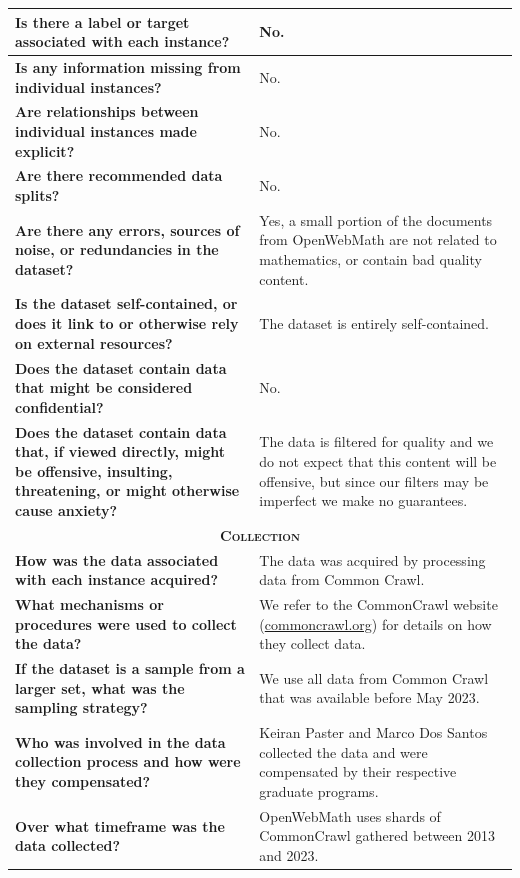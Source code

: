 \begin{longtable}{p{6cm}|p{6cm}}
    \textbf{Is there a label or target associated with each instance?} & No. \\ \midrule
    \textbf{Is any information missing from individual instances?} & No. \\ \midrule
    \textbf{Are relationships between individual instances made explicit?} & No. \\ \midrule
    \textbf{Are there recommended data splits?} & No. \\ \midrule
    \textbf{Are there any errors, sources of noise, or redundancies in the dataset?} & Yes, a small portion of the documents from OpenWebMath are not related to mathematics, or contain bad quality content. \\ \midrule
    \textbf{Is the dataset self-contained, or does it link to or otherwise rely on external resources?} & The dataset is entirely self-contained. \\ \midrule
    \textbf{Does the dataset contain data that might be considered confidential?} & No. \\ \midrule
    \textbf{Does the dataset contain data that, if viewed directly, might be offensive, insulting, threatening, or might otherwise cause anxiety?} & The data is filtered for quality and we do not expect that this content will be offensive, but since our filters may be imperfect we make no guarantees. \\ \midrule
    \multicolumn{2}{c}{\textsc{\textbf{Collection}}} \\ \midrule
    \textbf{How was the data associated with each instance acquired?} & The data was acquired by processing data from Common Crawl. \\ \midrule
    \textbf{What mechanisms or procedures were used to collect the data?} & We refer to the CommonCrawl website (\href{https://commoncrawl.org/}{commoncrawl.org}) for details on how they collect data. \\ \midrule
    \textbf{If the dataset is a sample from a larger set, what was the sampling strategy?} & We use all data from Common Crawl that was available before May 2023. \\ \midrule
    \textbf{Who was involved in the data collection process and how were they compensated?} & Keiran Paster and Marco Dos Santos collected the data and were compensated by their respective graduate programs. \\ \midrule
    \textbf{Over what timeframe was the data collected?} & OpenWebMath uses shards of CommonCrawl gathered between 2013 and 2023.   \\ \midrule

\end{longtable}
